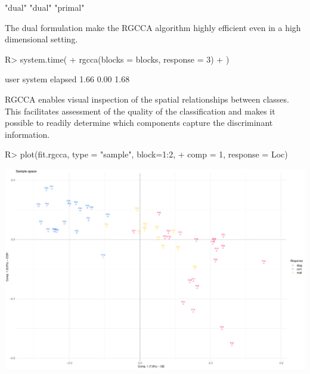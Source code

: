 \documentclass[
]{jss}
\begin{document}
\footnotesize

\begin{CodeChunk}
\begin{CodeOutput}
[1] "dual"   "dual"   "primal"
\end{CodeOutput}
\end{CodeChunk}

\normalsize

The dual formulation make the RGCCA algorithm highly efficient even in a
high dimensional setting.

\footnotesize

\begin{CodeChunk}
\begin{CodeInput}
R> system.time(
+   rgcca(blocks = blocks, response = 3)
+ )
\end{CodeInput}
\begin{CodeOutput}
   user  system elapsed 
   1.66    0.00    1.68 
\end{CodeOutput}
\end{CodeChunk}

\normalsize

RGCCA enables visual inspection of the spatial relationships between
classes. This facilitates assessment of the quality of the
classification and makes it possible to readily determine which
components capture the discriminant information.

\footnotesize

\begin{CodeChunk}
\begin{CodeInput}
R> plot(fit.rgcca, type = "sample", block=1:2,
+      comp = 1, response = Loc)
\end{CodeInput}


\begin{center}\includegraphics{RGCCA_vignette_files/figure-latex/unnamed-chunk-37-1} \end{center}

\end{CodeChunk}
\end{document}
